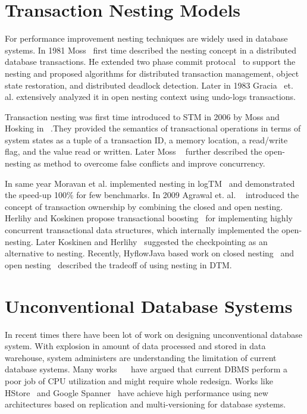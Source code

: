 \documentclass[12pt,english]{report}
\begin{document}
\section{Transaction Nesting Models}

For performance improvement nesting techniques are widely used in database systems. In 1981 Moss~\cite{moss1981nested} first time described the nesting concept in a distributed database transactions. He extended two phase commit protocal~\cite{TwoPC:weikum1991principles} to support the nesting and proposed algorithms for distributed transaction management, object state restoration, and distributed deadlock detection. Later in 1983 Gracia~\cite{garcia1983using} et. al. extensively analyzed it in open nesting context using undo-logs transactions. 

Transaction nesting was first time introduced to STM in 2006 by  Moss and Hosking in ~\cite{moss2006nested}.They provided the semantics of transactional operations in terms of system states as a tuple of a transaction ID, a memory location, a read/write flag, and the value read or written. Later Moss ~\cite{moss2006open} further described the open-nesting as method to overcome false conflicts and improve concurrency. 

In same year Moravan et al. implemented nesting in logTM~\cite{moravan2006supporting} and demonstrated the speed-up 100\% for few benchmarks. In 2009 Agrawal et. al. ~\cite{agrawal2009safe} introduced the concept of transaction ownership by combining the closed and open nesting. Herlihy and Koskinen propose transactional boosting~\cite{herlihy2008transactional} for implementing highly concurrent transactional data structures, which internally implemented the open-nesting. Later Koskinen and Herlihy~\cite{koskinen2008checkpoints} suggested the checkpointing as an alternative to nesting. Recently, HyflowJava based work on closed nesting~\cite{turcu2012closed} and open nesting~\cite{turcu2012open} described the tradeoff of using nesting in DTM. 

\section{Unconventional Database Systems}
In recent times there have been lot of work on designing unconventional database system. With explosion in amount of data processed and stored in data warehouse, system administers are understanding the limitation of current database systems. Many works ~\cite{Stonebraker:2007:EAE:1325851.1325981}~\cite{harizopoulos2008oltp} have argued that current DBMS perform a poor job of CPU utilization and might require whole redesign. Works like HStore~\cite{HSTORE:kallman2008h} and Google Spanner~\cite{corbett2012spanner} have achieve high performance using new architectures based on replication and multi-versioning for database systems. 
\end{document}
